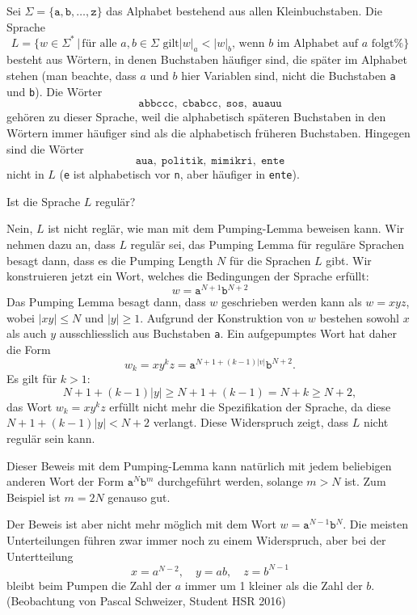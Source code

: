 Sei $\Sigma=\{\texttt{a},\texttt{b},\dots,\texttt{z}\}$ das Alphabet
bestehend aus allen Kleinbuchstaben. Die Sprache
\[
L=\{ w\in\Sigma^*
\,
|\,
\text{
für alle $a,b\in\Sigma$ gilt
$|w|_a < |w|_b$, wenn $b$ im Alphabet auf $a$ folgt%
}
\}
\]
besteht aus Wörtern, in denen Buchstaben häufiger sind, die später im
Alphabet stehen (man beachte, dass $a$ und $b$ hier Variablen sind,
nicht die Buchstaben \texttt{a} und \texttt{b}).
Die Wörter
\[
\texttt{abbccc},\;
\texttt{cbabcc},\;
\texttt{sos},\;
\texttt{auauu}
\]
gehören zu dieser Sprache, weil die alphabetisch späteren Buchstaben
in den Wörtern immer häufiger sind als die alphabetisch
früheren Buchstaben. Hingegen sind die Wörter 
\[
\texttt{aua},\;
\texttt{politik},\;
\texttt{mimikri},\;
\texttt{ente}
\]
nicht in $L$ (\texttt{e} ist alphabetisch vor \texttt{n}, aber häufiger
in \texttt{ente}).

Ist die Sprache $L$ regulär?


\begin{loesung}
Nein, $L$ ist nicht reglär, wie man mit dem Pumping-Lemma beweisen kann.
Wir nehmen dazu an, dass $L$ regulär sei, das Pumping Lemma für
reguläre Sprachen besagt dann, dass es die Pumping Length $N$ für die
Sprachen $L$ gibt.
Wir konstruieren jetzt ein Wort, welches die Bedingungen der Sprache
erfüllt:
\[
w=\texttt{a}^{N+1}\texttt{b}^{N+2}
\]
Das Pumping Lemma besagt dann, dass $w$ geschrieben werden kann als
$w=xyz$, wobei $|xy|\le N$ und $|y|\ge 1$. 
Aufgrund der Konstruktion von $w$ bestehen sowohl $x$ als auch $y$
ausschliesslich aus Buchstaben \texttt{a}.
Ein aufgepumptes Wort hat daher die Form
\[
w_k=xy^kz = \texttt{a}^{N+1+(k-1)|v|}\texttt{b}^{N+2}.
\]
Es gilt für $k > 1$:
\[
N+1+(k-1)|y|\ge N+1+(k-1)=N+k\ge N+2,
\]
das Wort $w_k=xy^kz$ erfüllt nicht mehr die Spezifikation der Sprache,
da diese $N+1+(k-1)|y| < N+2$ verlangt.
Diese Widerspruch zeigt, dass $L$ nicht regulär sein kann.
\end{loesung}

\begin{diskussion}
Dieser Beweis mit dem Pumping-Lemma kann natürlich mit jedem beliebigen
anderen Wort der Form $\texttt{a}^N\texttt{b}^{m}$ durchgeführt werden,
solange $m > N$ ist. Zum Beispiel ist $m=2N$ genauso gut.

Der Beweis ist aber nicht mehr möglich mit dem Wort
$w=\texttt{a}^{N-1}\texttt{b}^N$.
Die meisten Unterteilungen führen zwar immer noch zu einem
Widerspruch, aber bei der Untertteilung
\[
x = a^{N-2}, \quad y=ab, \quad z= b^{N-1}
\]
bleibt beim Pumpen die Zahl der $a$ immer um 1 kleiner als
die Zahl der $b$.
(Beobachtung von Pascal Schweizer, Student HSR 2016)
\end{diskussion}

